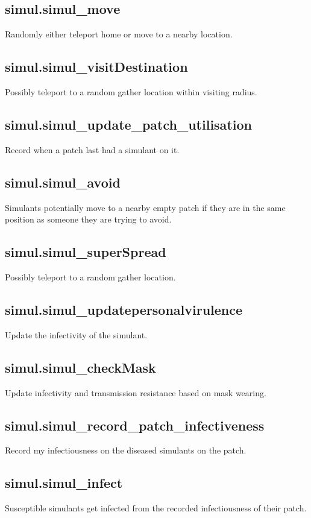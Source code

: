 \documentclass[]{article}
\begin{document}
\subsection{simul.simul\_move}
Randomly either teleport home or move to a nearby location.

\subsection{simul.simul\_visitDestination}
Possibly teleport to a random gather location within visiting radius.

\subsection{simul.simul\_update\_patch\_utilisation}
Record when a patch last had a simulant on it.

\subsection{simul.simul\_avoid}
Simulants potentially move to a nearby empty patch if they are in the same position as someone they are trying to avoid.

\subsection{simul.simul\_superSpread}
Possibly teleport to a random gather location.

\subsection{simul.simul\_updatepersonalvirulence}
Update the infectivity of the simulant.

\subsection{simul.simul\_checkMask}
Update infectivity and transmission resistance based on mask wearing.

\subsection{simul.simul\_record\_patch\_infectiveness}
Record my infectiousness on the diseased simulants on the patch.

\subsection{simul.simul\_infect}
Susceptible simulants get infected from the recorded infectiousness of their patch.
\end{document}
